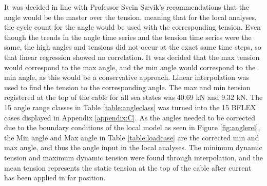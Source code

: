 \noindent It was decided in line with Professor Svein Sævik's recommendations that the angle would be the master over the tension, meaning that for the local analyses, the cycle count for the angle would be used with the corresponding tension. Even though the trends in the angle time series and the tension time series were the same, the high angles and tensions did not occur at the exact same time steps, so that linear regression showed no correlation. It was decided that the max tension would correspond to the max angle, and the min angle would correspond to the min angle, as this would be a conservative approach.  Linear interpolation was used to find the tension to the corresponding angle. The max and min tension registered at the top of the cable for all sea states was 40.69 kN and 9.32 kN. \newline
\newline
\noindent The 15 angle range classes in Table \ref{table:angleclass} was turned into the 15 BFLEX cases displayed in Appendix \ref{appendix:C}. As the angles needed to be corrected due to the boundary conditions of the local model as seen in Figure \ref{fig:anglerel}, the Min angle and Max angle in Table \ref{table:loadcase} are the corrected min and max angle, and thus the angle input in the local analyses. The minimum dynamic tension and maximum dynamic tension were found through interpolation, and the mean tension represents the static tension at the top of the cable after current has been applied in far position. 





